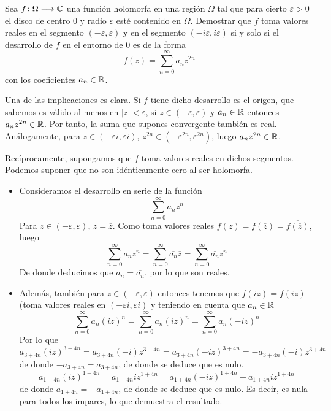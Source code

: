 \documentclass[twoside]{article}
\begin{document}
\begin{ejercicio}{6}
Sea $f\colon{\Omega}\longrightarrow{\mathbb{C}}$ una función holomorfa en una región $\Omega$ tal que para cierto $\varepsilon>0$ el disco de centro $0$ y radio $\varepsilon$ esté contenido en $\Omega$. Demostrar que $f$ toma valores reales en el segmento $(-\varepsilon,\varepsilon)$ y en el segmento $(-i\varepsilon,i\varepsilon)$ si y solo si el desarrollo de $f$ en el entorno de $0$ es de la forma
$$
f(z)=\sum_{n=0}^\infty a_nz^{2n}
$$
con los coeficientes $a_n \in \mathbb{R}$.
\end{ejercicio}
\begin{solucion}
Una de las implicaciones es clara. Si $f$ tiene dicho desarrollo es el origen, que sabemos es válido al menos en $|z|<\varepsilon$, si $z\in (-\varepsilon,\varepsilon)$ y $a_n\in \mathbb{R}$ entonces $a_nz^{2n} \in \mathbb{R}$. Por tanto, la suma que supones convergente también es real. Análogamente, para $z\in (-\varepsilon i,\varepsilon i)$, $z^{2n} \in (-\varepsilon^{2n},\varepsilon^{2n})$, luego $a_n z^{2n}\in \mathbb{R}$.

Recíprocamente, supongamos que $f$ toma valores reales en dichos segmentos. Podemos suponer que no son idénticamente cero al ser holomorfa. 
\begin{itemize}
\item Consideramos el desarrollo en serie de la función
$$\sum_{n=0}^\infty a_n z^n
$$
Para $z\in(-\varepsilon,\varepsilon)$, $z=\overline{z}$. Como toma valores reales $f(z)=f(\overline{z})=\overline{f(\overline{z})}$, luego
$$
\sum_{n=0}^\infty a_n z^n = \sum_{n=0}^\infty \overline{a_n} \overline{z} = \sum_{n=0}^\infty \overline{a_n}z^n
$$
De donde deducimos que $a_n=\overline{a_n}$, por lo que son reales.
\item Además, también para $z\in (-\varepsilon,\varepsilon)$ entonces tenemos que $f(iz) = \overline{f(iz)}$ (toma valores reales en $(-\varepsilon i, \varepsilon i)$ y teniendo en cuenta que $a_n \in \mathbb{R}$
$$
\sum_{n=0}^\infty a_n (iz)^n = \sum_{n=0}^\infty {\overline{a_n ({iz})^n}} = \sum_{n=0}^\infty {a_n ({-iz})^n}  
$$
Por lo que 
$$
a_{3+4n} (iz)^{3+4n} = a_{3+4n}(-i)z^{3+4n} = a_{3+4n}(-iz)^{3+4n} = -a_{3+4n}(-i)z^{3+4n}
$$
de donde $-a_{3+4n}=a_{3+4n}$, de donde se deduce que es nulo.
$$
a_{1+4n} (iz)^{1+4n} = a_{1+4n}iz^{1+4n} = a_{1+4n}(-iz)^{1+4n} -a_{1+4n}iz^{1+4n}
$$
de donde $a_{1+4n}=-a_{1+4n}$, de donde se deduce que es nulo.  Es decir, es nula para todos los impares, lo que demuestra el resultado.
\end{itemize}
\end{solucion}
\newpage
\end{document}
